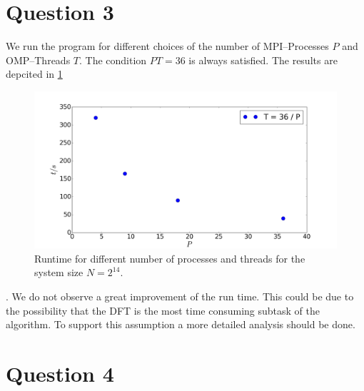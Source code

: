 \section*{Question 3}

We run the program for different choices of the number of MPI--Processes $P$ and OMP--Threads $T$. The condition $PT = 36$ is always satisfied. The results are depcited in \ref{fig:pt}\begin{figure}[h] 
  \centering
     \includegraphics[width=\textwidth]{pic/pt.png}
  \caption{Runtime for different number of processes and threads for the system size $N = 2^14$.}
  \label{fig:pt}
\end{figure}. We do not observe a great improvement of the run time. This could be due to the possibility that the DFT is the most time consuming subtask of the algorithm. To support this assumption a more detailed analysis should be done.




\section*{Question 4}


